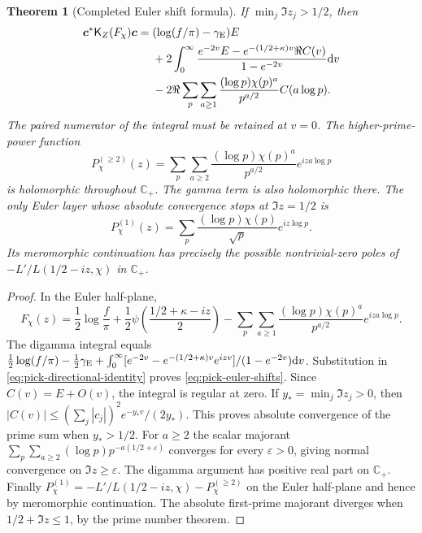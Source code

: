 \documentclass[11pt]{article}
\newtheorem{theorem}{Theorem}[section]
\theoremstyle{definition}
\theoremstyle{remark}
\newcommand{\C}{\mathbb C}
\newcommand{\dd}{\mathrm d}
\begin{document}
\begin{theorem}[Completed Euler shift formula]
\label{thm:pick-euler-shifts}
If $\min_j\Im z_j>1/2$, then
\begin{equation}
 \begin{split}
 \boldsymbol c^*\mathsf K_Z(F_\chi)\boldsymbol c
 ={}&(\log(f/\pi)-\gamma_{\rm E})E\\
 &+2\int_0^\infty
 \frac{e^{-2v}E-e^{-(1/2+\kappa)v}\Re C(v)}{1-e^{-2v}}\dd v\\
 &-2\Re\sum_p\sum_{a\ge1}
 \frac{(\log p)\chi(p)^a}{p^{a/2}}C(a\log p).
 \end{split}
 \label{eq:pick-euler-shifts}
\end{equation}
The paired numerator of the integral must be retained at $v=0$.
The higher-prime-power function
\begin{equation}
 P_\chi^{(\ge2)}(z)=\sum_p\sum_{a\ge2}
       \frac{(\log p)\chi(p)^a}{p^{a/2}}e^{iza\log p}
 \label{eq:pick-higher-powers}
\end{equation}
is holomorphic throughout $\C_+$.  The gamma term is also holomorphic
there.  The only Euler layer whose absolute convergence stops at
$\Im z=1/2$ is
\begin{equation}
 P_\chi^{(1)}(z)=\sum_p\frac{(\log p)\chi(p)}{\sqrt p}
                                      e^{iz\log p}.
 \label{eq:pick-first-prime}
\end{equation}
Its meromorphic continuation has precisely the possible nontrivial-zero
poles of $-L'/L(1/2-iz,\chi)$ in $\C_+$.
\end{theorem}

\begin{proof}
In the Euler half-plane,
\[
 F_\chi(z)=\frac12\log\frac f\pi
 +\frac12\psi\!\left(\frac{1/2+\kappa-iz}{2}\right)
 -\sum_p\sum_{a\ge1}\frac{(\log p)\chi(p)^a}{p^{a/2}}
                                      e^{iza\log p}.
\]
The digamma integral equals
$\tfrac12\log(f/\pi)-\tfrac12\gamma_{\rm E}
+\int_0^\infty[e^{-2v}-e^{-(1/2+\kappa)v}e^{izv}]/(1-e^{-2v})\dd v$.
Substitution in \eqref{eq:pick-directional-identity} proves
\eqref{eq:pick-euler-shifts}.  Since $C(v)=E+O(v)$, the integral is
regular at zero.  If $y_* =\min_j\Im z_j>0$, then
$|C(v)|\le(\sum_j|c_j|)^2e^{-y_*v}/(2y_*)$.
This proves absolute convergence of the prime sum when $y_*>1/2$.
For $a\ge2$ the scalar majorant
$\sum_p\sum_{a\ge2}(\log p)p^{-a(1/2+\varepsilon)}$
converges for every $\varepsilon>0$, giving normal convergence on
$\Im z\ge\varepsilon$.  The digamma argument has positive real
part on $\C_+$.  Finally
$P_\chi^{(1)}=-L'/L(1/2-iz,\chi)-P_\chi^{(\ge2)}$
on the Euler half-plane and hence by meromorphic continuation.
The absolute first-prime majorant diverges when
$1/2+\Im z\le1$, by the prime number theorem.
\end{proof}
\end{document}
